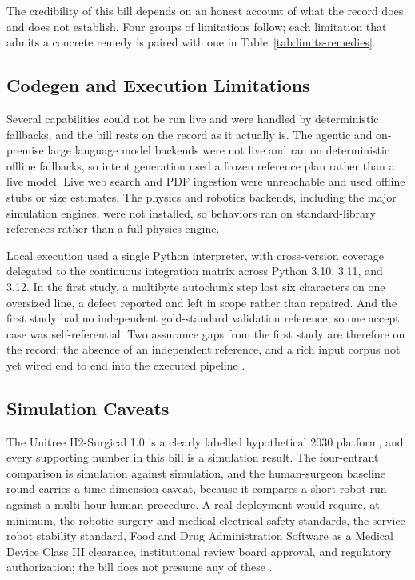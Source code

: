 
The credibility of this bill depends on an honest account of what the record does
and does not establish. Four groups of limitations follow; each limitation that
admits a concrete remedy is paired with one in Table~\ref{tab:limits-remedies}.

\subsection{Codegen and Execution Limitations}

Several capabilities could not be run live and were handled by deterministic
fallbacks, and the bill rests on the record as it actually is. The agentic and
on-premise large language model backends were not live and ran on deterministic
offline fallbacks, so intent generation used a frozen reference plan rather than a
live model. Live web search and PDF ingestion were unreachable and used offline
stubs or size estimates. The physics and robotics backends, including the major
simulation engines, were not installed, so behaviors ran on standard-library
references rather than a full physics engine. 

Local execution used a single
Python interpreter, with cross-version coverage delegated to the continuous
integration matrix across Python 3.10, 3.11, and 3.12. In the first study, a
multibyte autochunk step lost six characters on one oversized line, a defect
reported and left in scope rather than repaired. And the first study had no
independent gold-standard validation reference, so one accept case was
self-referential. Two assurance gaps from the first study are therefore on the
record: the absence of an independent reference, and a rich input corpus not yet
wired end to end into the executed pipeline \cite{kawchak2026vvuq01,
kawchak2026vvuq02}.


\subsection{Simulation Caveats}

The Unitree H2-Surgical 1.0 is a clearly labelled hypothetical 2030 platform, and
every supporting number in this bill is a simulation result. The four-entrant
comparison is simulation against simulation, and the human-surgeon baseline round
carries a time-dimension caveat, because it compares a short robot run against a
multi-hour human procedure. A real deployment would require, at minimum, the
robotic-surgery and medical-electrical safety standards, the service-robot
stability standard, Food and Drug Administration Software as a Medical Device
Class III clearance, institutional review board approval, and regulatory
authorization; the bill does not presume any of these \cite{iec8060127, iec60601,
iso13482}.

